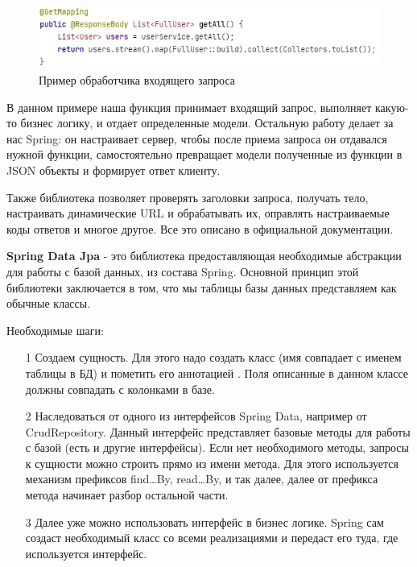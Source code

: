 \begin{figure}[ht!] 
	\center
	\includegraphics [scale=0.8] {my_folder/images//spring-web-route}
	\caption{Пример обработчика входящего запроса} 
	\label{fig:spring-web-route}  
\end{figure}

В данном примере наша функция принимает входящий запрос, выполняет какую-то бизнес логику, и отдает определенные модели. Остальную работу делает за нас Spring: он настраивает сервер, чтобы после приема запроса он отдавался нужной функции, самостоятельно превращает модели полученные из функции в JSON объекты и формирует ответ клиенту. 

Также библиотека позволяет проверять заголовки запроса, получать тело, настраивать динамические URL и обрабатывать их, оправлять настраиваемые коды ответов и многое другое. Все это описано в официальной документации\cite{spring}. 

\textbf{Spring Data Jpa} - это библиотека предоставляющая необходимые абстракции для работы с базой данных, из состава Spring. Основной принцип этой библиотеки заключается в том, что мы таблицы базы данных представляем как обычные классы. 

Необходимые шаги:

\begin{enumerate}
	\item[1] Создаем сущность. Для этого надо создать класс (имя совпадает с именем таблицы в БД) и пометить его аннотацией \textit{\@Entity}. Поля описанные в данном классе должны совпадать с колонками в базе.
	\item[2] Наследоваться от одного из интерфейсов Spring Data, например от CrudRepository. Данный интерфейс представляет базовые методы для работы с базой (есть и другие интерфейсы). Если нет необходимого методы, запросы к сущности можно строить прямо из имени метода. Для этого используется механизм префиксов find…By, read…By, и так далее, далее от префикса метода начинает разбор остальной части.
	\item[3] Далее уже можно использовать интерфейс в бизнес логике. Spring сам создаст необходимый класс со всеми реализациями и передаст его туда, где используется интерфейс. 
\end{enumerate} 
 
